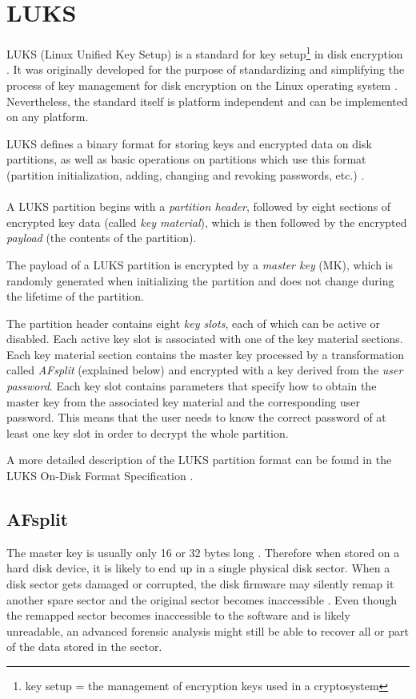 \documentclass[12pt,oneside]{fithesis2}
\begin{document}
      \section{LUKS}
      LUKS (Linux Unified Key Setup) is a standard for key setup\footnote{key setup = the management of encryption keys used in a cryptosystem} in disk encryption \cite{luks}. It was originally developed for the purpose of standardizing and simplifying the process of key management for disk encryption on the Linux operating system \cite[chapter 6]{Fruhwirth}. Nevertheless, the standard itself is platform independent and can be implemented on any platform.
      
      LUKS defines a binary format for storing keys and encrypted data on disk partitions, as well as basic operations on partitions which use this format (partition initialization, adding, changing and revoking passwords, etc.) \cite{luks}.
      
      \paragraph*{}
      A LUKS partition begins with a \emph{partition header}, followed by eight sections of encrypted key data (called \emph{key material}), which is then followed by the encrypted \emph{payload} (the contents of the partition).
      
      The payload of a LUKS partition is encrypted by a \emph{master key} (MK), which is randomly generated when initializing the partition and does not change during the lifetime of the partition.
      
      The partition header contains eight \emph{key slots}, each of which can be active or disabled. Each active key slot is associated with one of the key material sections. Each key material section contains the master key processed by a transformation called \emph{AFsplit} (explained below) and encrypted with a key derived from the \emph{user password}. Each key slot contains parameters that specify how to obtain the master key from the associated key material and the corresponding user password. This means that the user needs to know the correct password of at least one key slot in order to decrypt the whole partition.
      
      A more detailed description of the LUKS partition format can be found in the LUKS On-Disk Format Specification \cite[section 2.4]{luks}.
      
      \subsection{AFsplit}
      The master key is usually only 16 or 32 bytes long \cite[chapter 1]{luks}. Therefore when stored on a hard disk device, it is likely to end up in a single physical disk sector. When a disk sector gets damaged or corrupted, the disk firmware may silently remap it another spare sector and the original sector becomes inaccessible \cite[chapter 1]{luks}. Even though the remapped sector becomes inaccessible to the software and is likely unreadable, an advanced forensic analysis might still be able to recover all or part of the data stored in the sector.
      
\end{document}
